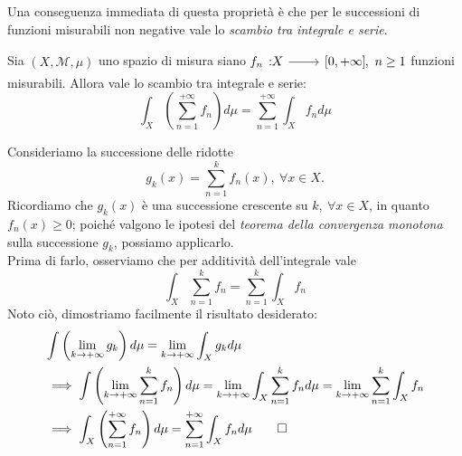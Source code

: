Una conseguenza immediata di questa proprietà è che per le successioni di funzioni misurabili non negative vale lo \textit{scambio tra integrale e serie}.
\begin{corollary}
Sia $\left(X,\mathcal{M},\mu\right)$ uno spazio di misura siano $\funz{f_n}{X}{\left[0,+\infty\right]},\ n\geq 1$ funzioni misurabili. Allora vale lo scambio tra integrale e serie:
	\begin{equation}
		\int_X\left(\sum_{n=1}^{+\infty}f_n\right)d\mu=\sum_{n=1}^{+\infty}\int_Xf_nd\mu
	\end{equation}
\end{corollary}
\begin{demonstration}
	Consideriamo la successione delle ridotte
	\begin{equation*}
		g_k(x)=\sum_{n=1}^{k}f_n(x),\ \forall x\in X.
	\end{equation*}
	Ricordiamo che $g_k(x)$ è una successione crescente su $k,\ \forall x\in X$, in quanto $f_n(x)\geq 0$; poiché valgono le ipotesi del \textit{teorema della convergenza monotona} sulla successione $g_k$, possiamo applicarlo.\\
	Prima di farlo, osserviamo che per additività dell'integrale vale
	\begin{equation*}
		\int_X \sum_{n=1}^{k}f_n=\sum_{n=1}^{k}\int_X f_n
	\end{equation*}
	Noto ciò, dimostriamo facilmente il risultato desiderato: 
	\begin{align*}
		&\int \left(\lim_{k\to+\infty}g_k\right)d\mu=\lim_{k\to+\infty}\int_X g_kd\mu\\
		&\implies \int \left(\lim_{k\to+\infty}\sum_{n=1}^{k}f_n\right)d\mu=\lim_{k\to+\infty}\int_X \sum_{n=1}^{k}f_nd\mu=\lim_{k\to+\infty}\sum_{n=1}^{k}\int_X f_n\\
		&\implies \int_X\left(\sum_{n=1}^{+\infty}f_n\right)d\mu=\sum_{n=1}^{+\infty}\int_Xf_nd\mu\qedhere
	\end{align*}
\end{demonstration}
